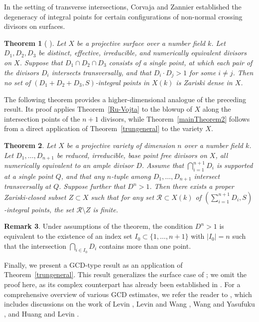 \documentclass[10pt]{amsart}
\numberwithin{equation}{section}
\theoremstyle{plain}
\newtheorem{theorem}{Theorem}[section]
\theoremstyle{definition}
\newtheorem{remark}[theorem]{Remark}
\begin{document}
  In the setting of transverse intersections, Corvaja and Zannier established the degeneracy of integral points for certain configurations of non-normal crossing divisors on surfaces.

\begin{theorem}[{ \cite[Corollary 1.2]{CZ2006}}]\label{CZ2006}
    Let $X$ be a projective surface over a number field $k$. Let $D_1,D_2,D_3$ be distinct, effective, irreducible, and numerically equivalent divisors on $X$. Suppose that $D_1 \cap D_2 \cap D_3$ consists of a single point, at which each pair of the divisors $D_i$ intersects transversally, and that $D_i\cdot D_j >1$ for some $i\neq j$. Then no set of $(D_1+D_2+D_3,S)$-integral points in $X(k)$ is Zariski dense in $X$.
\end{theorem}





The following theorem provides a higher-dimensional analogue of the preceding result. Its proof applies Theorem~\ref{Ru-Vojta} to the blowup of $X$ along the intersection points of the $n+1$ divisors, while 
 Theorem~\ref{mainTheorem2} follows from a direct application of Theorem~\ref{trungeneral} to the variety $X$. 
 
  \begin{theorem}\label{mainTheoremCZrev}
Let $X$ be a  projective variety  of dimension $n$ over a number field $k$. 
Let $D_1, \ldots,D_{n+1}$ be reduced, irreducible, base point free divisors on $X$, all numerically equivalent to an ample divisor $D$.  
Assume that  
$\bigcap_{i=1}^{n+1}D_i $
is supported at a single point $Q$, and that
   any $n$-tuple among  $D_1, \ldots,D_{n+1}$ intersect  transversally at $Q$.
Suppose further that  
 $ D^n > 1$. Then  there exists a proper Zariski-closed subset $Z\subset X$ such that for any set $\mathcal R\subset X(k)$ of $(\sum_{i=1}^{n+1}D_i, S)$-integral points, the set   $\mathcal  R\setminus Z$ is finite.
 \end{theorem}
\begin{remark}\label{localcondition2}
Under assumptions of the theorem, the condition $ D^n > 1 $  is equivalent to the existence of an index set $I_0 \subset \{1,\ldots,n+1\}$ with $|I_0|=n$ such that the intersection $\bigcap_{i \in I_0} D_i$ contains more than one point. 
\end{remark} 

  
 
 
 
 
 
Finally, we present a GCD-type result as an application of Theorem~\ref{trungeneral}. This result generalizes the surface case of \cite[Theorem 5.3]{HLX}; we omit the proof here, as its complex counterpart has already been established in \cite{WX2025}. For a comprehensive overview of various GCD estimates, we refer the reader to \cite{HLX}, which includes discussions on the work of Levin \cite{LevinGCD}, Levin and Wang \cite{LW}, Wang and Yasufuku \cite{WY}, and Huang and Levin \cite{HL}.
\end{document}
